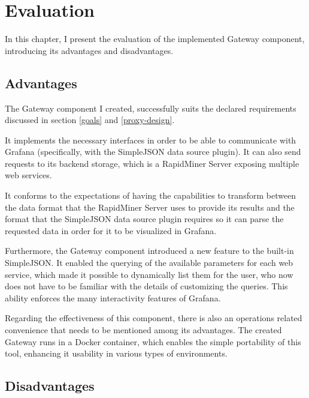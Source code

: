 \chapter{Evaluation}

In this chapter, I present the evaluation of the implemented Gateway component, introducing its advantages and disadvantages.

\section{Advantages}

The Gateway component I created, successfully suits the declared requirements discussed in section \ref{goals} and \ref{proxy-design}.

It implements the necessary interfaces in order to be able to communicate with Grafana (specifically, with the SimpleJSON data source plugin). It can also send requests to its backend storage, which is a RapidMiner Server exposing multiple web services.

It conforms to the expectations of having the capabilities to transform between the data format that the RapidMiner Server uses to provide its results and the format that the SimpleJSON data source plugin requires so it can parse the requested data in order for it to be visualized in Grafana.

Furthermore, the Gateway component introduced a new feature to the built-in SimpleJSON. It enabled the querying of  the available parameters for each web service, which made it possible to dynamically list them for the user, who now does not have to be familiar with the details of customizing the queries. This ability enforces the many interactivity features of Grafana.

Regarding the effectiveness of this component, there is also an operations related convenience that needs to be mentioned among its advantages. The created Gateway runs in a Docker container, which enables the simple portability of this tool, enhancing it usability in various types of environments.

\section{Disadvantages} \label{proxy-cons}

